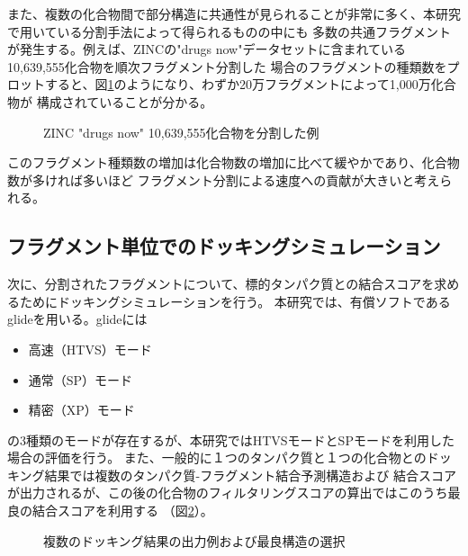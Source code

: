 また、複数の化合物間で部分構造に共通性が見られることが非常に多く、本研究で用いている分割手法によって得られるものの中にも
多数の共通フラグメントが発生する。例えば、ZINCの"drugs now"データセットに含まれている10,639,555化合物を順次フラグメント分割した
場合のフラグメントの種類数をプロットすると、図\ref{fig:decomposition_amount}のようになり、わずか20万フラグメントによって1,000万化合物が
構成されていることが分かる。
\begin{figure}[htp]
 \begin{center}
  \caption{ZINC "drugs now" 10,639,555化合物を分割した例}
  \label{fig:decomposition_amount}
 \end{center}
\end{figure}
このフラグメント種類数の増加は化合物数の増加に比べて緩やかであり、化合物数が多ければ多いほど
フラグメント分割による速度への貢献が大きいと考えられる。

\subsection{フラグメント単位でのドッキングシミュレーション}
次に、分割されたフラグメントについて、標的タンパク質との結合スコアを求めるためにドッキングシミュレーションを行う。
本研究では、有償ソフトであるglide\cite{Friesner2004}を用いる。glideには
\begin{itemize}
\item 高速（HTVS）モード
\item 通常（SP）モード
\item 精密（XP）モード
\end{itemize}
の3種類のモードが存在するが、本研究ではHTVSモードとSPモードを利用した場合の評価を行う。
また、一般的に１つのタンパク質と１つの化合物とのドッキング結果では複数のタンパク質-フラグメント結合予測構造および
結合スコアが出力されるが、この後の化合物のフィルタリングスコアの算出ではこのうち最良の結合スコアを利用する
（図\ref{fig:fragment_result}）。

\begin{figure}[t]
\begin{minipage}{0.5\hsize}
 \begin{center}
 \end{center}
\end{minipage}
\begin{minipage}{0.5\hsize}
 \begin{center}
 \end{center}
\end{minipage}
 \caption{複数のドッキング結果の出力例および最良構造の選択}
 \label{fig:fragment_result}
\end{figure}

